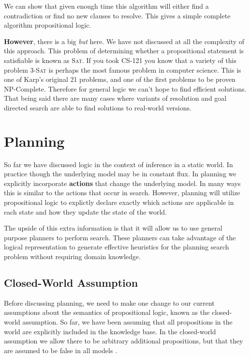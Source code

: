 \documentclass[11pt]{article}
\begin{document}
We can show that given enough time this algorithm will either find a contradiction or find no new clauses to resolve. This gives a simple complete algorithm propositional logic. 


\textbf{However}, there is a big \textit{but} here. We have not discussed at all the complexity of this approach. This problem of determining whether a propositional statement is satisfiable is known as \textsc{Sat}. If you took CS-121 you know that a variety of this problem \textsc{3-Sat} is perhaps the most famous problem in computer science. This is one of Karp's original 21 problems, and one of the first problems to be proven NP-Complete. Therefore for general logic we can't hope to find efficient solutions. That being said there are many cases where variants of resolution and goal directed search are able to find solutions to real-world versions. 


\section{Planning}

So far we have discussed logic in the context of inference in a static world. In practice though the underlying model may be in constant flux. In planning we explicitly incorporate \textbf{actions} that change the underlying model. In many ways this is similar to the actions that occur in search. However, planning will utilize propositional logic to explictly declare exactly which actions are applicable in each state and how they update the state of the world. 

The upside of this extra information is that it will allow us to use general purpose planners to perform search. These planners can take advantage of the logical representation to generate effective heuristics for the planning search problem without requiring domain knowledge.

\subsection{Closed-World Assumption}

Before discussing planning, we need to make one change to our current
assumptions about the semantics of propositional logic, known as the
closed-world assumption. So far, we have been assuming that all propositions
in the world are explicitly included in the knowledge base. In the
closed-world assumption we allow there to be arbitrary additional
propositions, but that they are assumed to be false in all models . 
\end{document}
